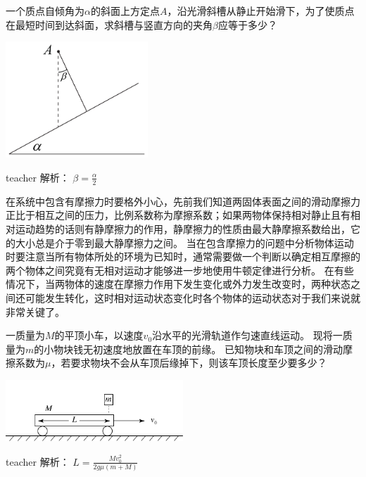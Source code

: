 \begin{example}
	
	一个质点自倾角为$\alpha$的斜面上方定点$A$，沿光滑斜槽从静止开始滑下，为了使质点在最短时间到达斜面，求斜槽与竖直方向的夹角$\beta$应等于多少？
	\begin{flushright}
		\includegraphics[width = 0.4\textwidth]{images/newton-10.pdf} 
	\end{flushright}
	\begin{taggedblock}{teacher}
		\noindent
		解析：
		$\beta=\frac{\alpha}{2}$
	\end{taggedblock}
\end{example}

在系统中包含有摩擦力时要格外小心，先前我们知道两固体表面之间的滑动摩擦力正比于相互之间的压力，比例系数称为摩擦系数；如果两物体保持相对静止且有相对运动趋势的话则有静摩擦力的作用，静摩擦力的性质由最大静摩擦系数给出，它的大小总是介于零到最大静摩擦力之间。
当在包含摩擦力的问题中分析物体运动时要注意当所有物体所处的环境为已知时，通常需要做一个判断以确定相互摩擦的两个物体之间究竟有无相对运动才能够进一步地使用牛顿定律进行分析。
在有些情况下，当两物体的速度在摩擦力作用下发生变化或外力发生改变时，两种状态之间还可能发生转化，这时相对运动状态变化时各个物体的运动状态对于我们来说就非常关键了。

\begin{example}
一质量为$M$的平顶小车，以速度$v_0$沿水平的光滑轨道作匀速直线运动。
现将一质量为$m$的小物块钱无初速度地放置在车顶的前缘。
已知物块和车顶之间的滑动摩擦系数为$\mu$，若要求物块不会从车顶后缘掉下，则该车顶长度至少要多少？
\begin{flushright}
\includegraphics[width=0.5\textwidth]{images/newton-problem-1.pdf}
\end{flushright}
\begin{taggedblock}{teacher}
\noindent
解析：
$L=\frac{Mv_0^2}{2g\mu(m+M)}$
\end{taggedblock}
\end{example}



